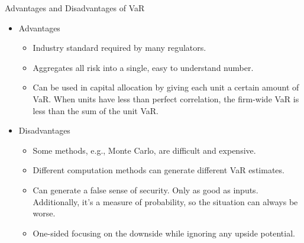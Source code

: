 \documentclass[../custom]{flashcards}
\begin{document}
\begin{flashcard}[\studyArea]{Advantages and Disadvantages of VaR}
    \begin{itemize}
        \item Advantages
        \begin{itemize}
            \item Industry standard required by many regulators.
            \item Aggregates all risk into a single, easy to understand number.
            \item Can be used in capital allocation by giving each unit a certain amount of VaR. When units have less than perfect correlation, the firm-wide VaR is less than the sum of the unit VaR.
        \end{itemize}
        \item Disadvantages
        \begin{itemize}
            \item Some methods, e.g., Monte Carlo, are difficult and expensive.
            \item Different computation methods can generate different VaR estimates.
            \item Can generate a false sense of security. Only as good as inputs. Additionally, it's a measure of probability, so the situation can always be worse.
            \item One-sided focusing on the downside while ignoring any upside potential.
        \end{itemize}
    \end{itemize}
\end{flashcard}
\end{document}
